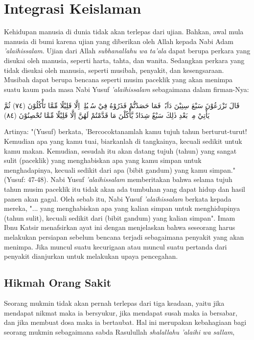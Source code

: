 \section{Integrasi Keislaman}
Kehidupan manusia di dunia tidak akan terlepas dari ujian. Bahkan, awal mula manusia di bumi karena ujian yang diberikan oleh Allah kepada Nabi Adam \textit{'alaihissalam}. Ujian dari Allah \textit{subhanallahu wa ta'ala} dapat berupa perkara yang disukai oleh manusia, seperti harta, tahta, dan wanita. Sedangkan perkara yang tidak disukai oleh manusia, seperti musibah, penyakit, dan kesengsaraan. Musibah dapat berupa bencana seperti musim paceklik yang akan menimpa suatu kaum pada masa Nabi Yusuf \textit{'alaihissalam} sebagaimana dalam firman-Nya:

\begin{flushright}
    \begin{RLtext}
        قَالَ تَزْرَعُوْنَ سَبْعَ سِنِيْنَ دَاَبًاۚ فَمَا حَصَدْتُّمْ فَذَرُوْهُ فِيْ سُنْۢبُلِهٖٓ اِلَّا قَلِيْلًا مِّمَّا تَأْكُلُوْنَ (٧٤) ثُمَّ يَأْتِيْ مِنْۢ بَعْدِ ذٰلِكَ سَبْعٌ شِدَادٌ يَّأْكُلْنَ مَا قَدَّمْتُمْ لَهُنَّ اِلَّا قَلِيْلًا مِّمَّا تُحْصِنُوْنَ (٨٤)
    \end{RLtext}
\end{flushright}

Artinya: "(Yusuf) berkata, 'Bercocoktanamlah kamu tujuh tahun berturut-turut! Kemudian apa yang kamu tuai, biarkanlah di tangkainya, kecuali sedikit untuk kamu makan. Kemudian, sesudah itu akan datang tujuh (tahun) yang sangat sulit (paceklik) yang menghabiskan apa yang kamu simpan untuk menghadapinya, kecuali sedikit dari apa (bibit gandum) yang kamu simpan." (Yusuf: 47-48). Nabi Yusuf \textit{'alaihissalam} memberitakan bahwa selama tujuh tahun musim paceklik itu tidak akan ada tumbuhan yang dapat hidup dan hasil panen akan gagal. Oleh sebab itu, Nabi Yusuf \textit{'alaihissalam} berkata kepada mereka, "... yang menghabiskan apa yang kalian simpan untuk menghidupinya (tahun sulit), kecuali sedikit dari (bibit gandum) yang kalian simpan". Imam Ibnu Katsir menafsirkan ayat ini dengan menjelaskan bahwa seseorang harus melakukan persiapan sebelum bencana terjadi sebagaimana penyakit yang akan menimpa. Jika muncul suatu kecurigaan atau muncul suatu pertanda dari penyakit dianjurkan untuk melakukan upaya pencegahan.


    \subsection{Hikmah Orang Sakit}
    Seorang mukmin tidak akan pernah terlepas dari tiga keadaan, yaitu jika mendapat nikmat maka ia bersyukur, jika mendapat susah maka ia bersabar, dan jika membuat dosa maka ia bertaubat. Hal ini merupakan kebahagiaan bagi seorang mukmin sebagaimana sabda Rasulullah \textit{shalallahu 'alaihi wa sallam}, 
    
